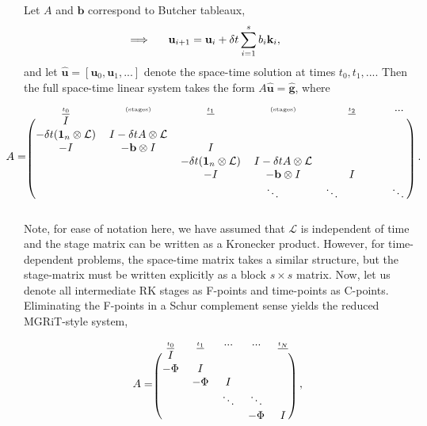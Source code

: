 \documentclass[a4paper,10pt]{article}
\begin{document}
Let $A$ and $\mathbf{b}$ correspond to Butcher tableaux,
%
\begin{align*}
\hspace{-6ex}\implies \hspace{3ex}\mathbf{u}_{i+1} & = \mathbf{u}_i + \delta t\sum_{i=1}^{s} b_i\mathbf{k}_i,
\end{align*}
%
and let $\hat{\mathbf{u}} = [\mathbf{u}_0, \mathbf{u}_1,...]$ denote the space-time solution
at times $t_0,t_1,...$. Then the full space-time linear system takes the form $A\hat{\mathbf{u}}
= \hat{\mathbf{g}}$, where
%
\begin{align*}
\hspace{-4ex}A = 
\begin{blockarray}{c c c c c c} \textnormal{\underline{\tiny{$t_0$}}} & \textnormal{\tiny(stages)} &
	\textnormal{\underline{\tiny{$t_1$}}} &  \textnormal{\tiny(stages)} & \textnormal{\underline{\tiny{$t_2$}}} & ... \\
\begin{block}{(c c c c c c)}
	I &  \\
	-\delta t(\mathbf{1}_n \otimes \mathcal{L}) & I - \delta t A\otimes \mathcal{L} &\\
	-I & -\mathbf{b}\otimes I & I \\ 
	& & -\delta t(\mathbf{1}_n \otimes \mathcal{L}) & I - \delta t A\otimes \mathcal{L} &  \\
	& & -I & -\mathbf{b}\otimes I & I \\
	&&& \ddots\text{\hspace{4ex}}  & \ddots\text{\hspace{8ex}}  & \ddots \\
	\end{block}
\end{blockarray}\hspace{1ex}.
\end{align*}
%
Note, for ease of notation here, we have assumed that $\mathcal{L}$ is independent of time
and the stage matrix can be written as a Kronecker product. However, for time-dependent
problems, the space-time matrix takes a similar structure, but the stage-matrix must be
written explicitly as a block $s\times s$ matrix. 
Now, let us denote all intermediate RK stages as F-points and time-points as C-points. 
Eliminating the F-points in a Schur complement sense yields the reduced MGRiT-style
system,
%
\begin{align*}
A & = \begin{blockarray}{c c c c c} \textnormal{\underline{\tiny{$t_0$}}} & \textnormal{\underline{\tiny{$t_1$}}} & ... &... &\textnormal{\underline{\tiny{$t_N$}}} \\
	\begin{block}{(c c c c c)}
	I & & & & \\
	-\Phi & I & & &\\
	 & -\Phi& I & & \\
	 &  & \ddots & \ddots  & \\
	 &  & & -\Phi & I \\
	\end{block}
	\end{blockarray} \hspace{1ex}, 
\end{align*}
\end{document}
